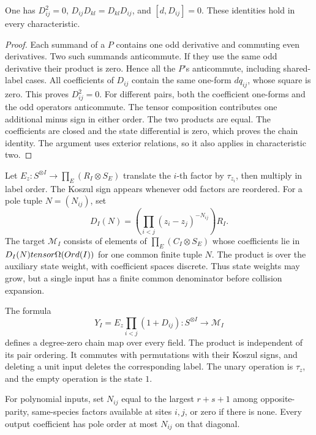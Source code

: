 \begin{lemma}\label{fs:lem:square-zero}
One has \(D_{ij}^2=0\), \(D_{ij}D_{kl}=D_{kl}D_{ij}\), and
\([d,D_{ij}]=0\).  These identities hold in every characteristic.
\end{lemma}

\begin{proof}
Each summand of a \(P\) contains one odd derivative and commuting
even derivatives.  Two such summands anticommute.  If they use the
same odd derivative their product is zero.  Hence all the \(P\)'s
anticommute, including shared-label cases.
All coefficients of \(D_{ij}\) contain the same one-form
\(dq_{ij}\), whose square is zero.  This proves \(D_{ij}^2=0\).
For different pairs, both the coefficient one-forms and the odd
operators anticommute.  The tensor composition contributes one
additional minus sign in either order.  The two products are equal.
The coefficients are closed and the state differential is zero,
which proves the chain identity.  The argument uses exterior
relations, so it also applies in characteristic two.
\end{proof}

Let \(E_z:S^{\otimes I}\to\prod_E(R_I\otimes S_E)\) translate
the \(i\)-th factor by \(\tau_{z_i}\), then multiply in label order.
The Koszul sign appears whenever odd factors are reordered.
For a pole tuple \(N=(N_{ij})\), set
\[
 D_I(N)=\left(\prod_{i<j}(z_i-z_j)^{-N_{ij}}\right)R_I.
\]
The target \(\mathscr M_I\) consists of elements of
\(\prod_E(C_I\otimes S_E)\) whose coefficients lie in
\(D_I(N)tensor\Omega(Ord(I))\) for one common finite tuple \(N\).
The product is over the auxiliary state weight, with coefficient
spaces discrete.  Thus state weights may grow, but a single input
has a finite common denominator before collision expansion.

\begin{theorem}\label{fs:thm:free-operation}
The formula
\begin{equation}\label{fs:eq:free-operation}
 Y_I=E_z\prod_{i<j}(1+D_{ij}):S^{\otimes I}\longrightarrow\mathscr M_I
\end{equation}
defines a degree-zero chain map over every field.
The product is independent of its pair ordering.
It commutes with permutations with their Koszul signs, and deleting
a unit input deletes the corresponding label.  The unary operation
is \(\tau_z\), and the empty operation is the state \(1\).

For polynomial inputs, set \(N_{ij}\) equal to the largest
\(r+s+1\) among opposite-parity, same-species factors available
at sites \(i,j\), or zero if there is none.  Every output
coefficient has pole order at most \(N_{ij}\) on that diagonal.
\end{theorem}

